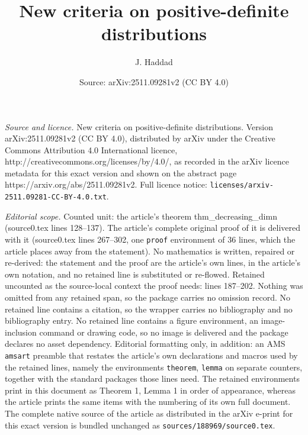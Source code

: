 \documentclass[10pt,a4paper]{amsart}
\title{New criteria on positive-definite distributions}
\author{J. Haddad}
\date{Source: arXiv:2511.09281v2 (CC BY 4.0)}
\begin{document}
\maketitle

\noindent\emph{Source and licence.} New criteria on positive-definite distributions. Version arXiv:2511.09281v2 (CC BY 4.0), distributed by arXiv under the Creative Commons Attribution 4.0 International licence, http://creativecommons.org/licenses/by/4.0/, as recorded in the arXiv licence metadata for this exact version and shown on the abstract page https://arxiv.org/abs/2511.09281v2. Full licence notice: \texttt{licenses/arxiv-2511.09281-CC-BY-4.0.txt}.\par\smallskip

\noindent\textit{Editorial scope.} Counted unit: the article's theorem thm\_decreasing\_dimn (source0.tex lines 128--137). The article's complete original proof of it is delivered with it (source0.tex lines 267--302, one \texttt{proof} environment of 36 lines, which the article places away from the statement). No mathematics is written, repaired or re-derived: the statement and the proof are the article's own lines, in the article's own notation, and no retained line is substituted or re-flowed.  Retained uncounted as the source-local context the proof needs: lines 187--202.  Nothing was omitted from any retained span, so the package carries no omission record.  No retained line contains a citation, so the wrapper carries no bibliography and no bibliography entry.  No retained line contains a figure environment, an image-inclusion command or drawing code, so no image is delivered and the package declares no asset dependency.  Editorial formatting only, in addition: an AMS \texttt{amsart} preamble that restates the article's own declarations and macros used by the retained lines, namely the environments \texttt{theorem}, \texttt{lemma} on separate counters, together with the standard packages those lines need.  The retained environments print in this document as Theorem 1, Lemma 1 in order of appearance, whereas the article prints the same items with the numbering of its own full document.  The complete native source of the article as distributed in the arXiv e-print for this exact version is bundled unchanged as \texttt{sources/188969/source0.tex}.
\end{document}
